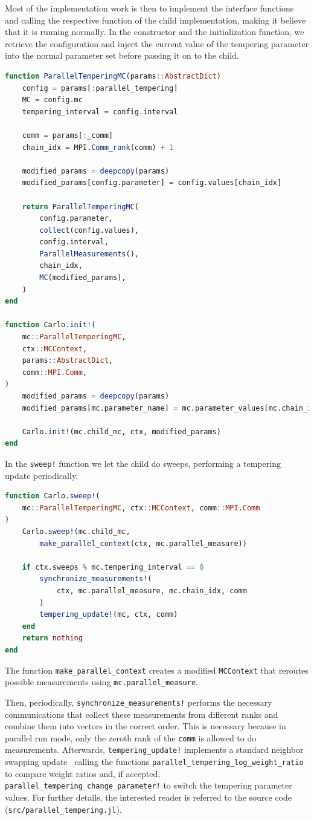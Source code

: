\documentclass{SciPost}
\begin{document}
Most of the implementation work is then to implement the interface functions and calling the respective function of the child implementation, making it believe that it is running normally. In the constructor and the initialization function, we retrieve the configuration and inject the current value of the tempering parameter into the normal parameter set before passing it on to the child.
\begin{lstlisting}[language=julia]
function ParallelTemperingMC(params::AbstractDict)
    config = params[:parallel_tempering]
    MC = config.mc
    tempering_interval = config.interval

    comm = params[:_comm]
    chain_idx = MPI.Comm_rank(comm) + 1

    modified_params = deepcopy(params)
    modified_params[config.parameter] = config.values[chain_idx]

    return ParallelTemperingMC(
        config.parameter,
        collect(config.values),
        config.interval,
        ParallelMeasurements(),
        chain_idx,
        MC(modified_params),
    )
end

function Carlo.init!(
    mc::ParallelTemperingMC,
    ctx::MCContext,
    params::AbstractDict,
    comm::MPI.Comm,
)
    modified_params = deepcopy(params)
    modified_params[mc.parameter_name] = mc.parameter_values[mc.chain_idx]

    Carlo.init!(mc.child_mc, ctx, modified_params)
end
\end{lstlisting}
In the \texttt{sweep!} function we let the child do sweeps, performing a tempering update periodically.
\begin{lstlisting}[language=julia]
function Carlo.sweep!(
    mc::ParallelTemperingMC, ctx::MCContext, comm::MPI.Comm
)
    Carlo.sweep!(mc.child_mc,
        make_parallel_context(ctx, mc.parallel_measure))

    if ctx.sweeps % mc.tempering_interval == 0
        synchronize_measurements!(
            ctx, mc.parallel_measure, mc.chain_idx, comm
        )
        tempering_update!(mc, ctx, comm)
    end
    return nothing
end
\end{lstlisting}
The function \verb+make_parallel_context+ creates a modified \texttt{MCContext} that reroutes possible measurements using \verb+mc.parallel_measure+.

Then, periodically,
\verb+synchronize_measurements!+ performs the necessary communications that collect these measurements from different ranks and combine them into vectors in the correct order. This is necessary because in parallel run mode, only the zeroth rank of the \texttt{comm} is allowed to do measurements.
Afterwards, \texttt{tempering\_{}update!} implements a standard neighbor swapping update~\cite{Earl2005} calling the functions \verb+parallel_tempering_log_weight_ratio+ to compare weight ratios and, if accepted, \verb+parallel_tempering_change_parameter!+ to switch the tempering parameter values. For further details, the interested reader is referred to the source code (\texttt{src/parallel\_{}tempering.jl}).
\end{document}
